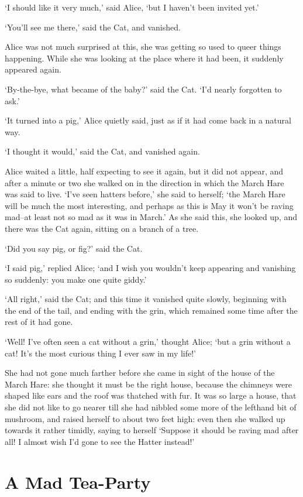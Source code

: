\documentclass[12pt]{book}
\begin{document}
  `I should like it very much,' said Alice, `but I haven't been
invited yet.'

  `You'll see me there,' said the Cat, and vanished.

  Alice was not much surprised at this, she was getting so used
to queer things happening.  While she was looking at the place
where it had been, it suddenly appeared again.

  `By-the-bye, what became of the baby?' said the Cat.  `I'd
nearly forgotten to ask.'

  `It turned into a pig,' Alice quietly said, just as if it had
come back in a natural way.

  `I thought it would,' said the Cat, and vanished again.

  Alice waited a little, half expecting to see it again, but it
did not appear, and after a minute or two she walked on in the
direction in which the March Hare was said to live.  `I've seen
hatters before,' she said to herself; `the March Hare will be
much the most interesting, and perhaps as this is May it won't be
raving mad--at least not so mad as it was in March.'  As she said
this, she looked up, and there was the Cat again, sitting on a
branch of a tree.

  `Did you say pig, or fig?' said the Cat.

  `I said pig,' replied Alice; `and I wish you wouldn't keep
appearing and vanishing so suddenly:  you make one quite giddy.'

  `All right,' said the Cat; and this time it vanished quite slowly,
beginning with the end of the tail, and ending with the grin,
which remained some time after the rest of it had gone.

  `Well!  I've often seen a cat without a grin,' thought Alice;
`but a grin without a cat!  It's the most curious thing I ever
saw in my life!'

  She had not gone much farther before she came in sight of the
house of the March Hare:  she thought it must be the right house,
because the chimneys were shaped like ears and the roof was
thatched with fur.  It was so large a house, that she did not
like to go nearer till she had nibbled some more of the lefthand
bit of mushroom, and raised herself to about two feet high:  even
then she walked up towards it rather timidly, saying to herself
`Suppose it should be raving mad after all!  I almost wish I'd
gone to see the Hatter instead!'

\chapter{A Mad Tea-Party}
\end{document}

